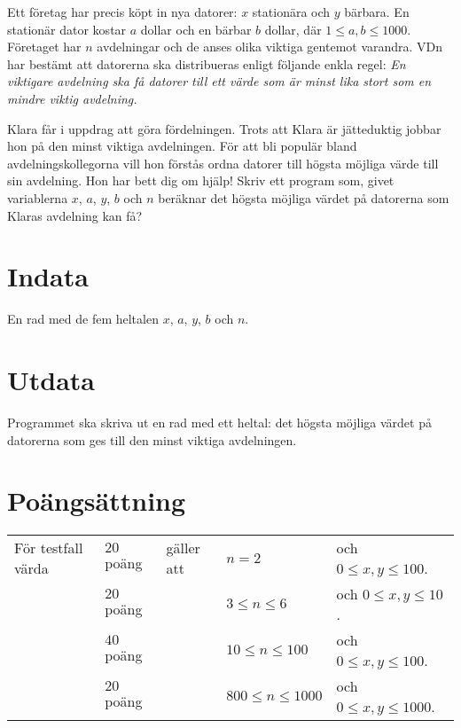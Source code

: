 
Ett företag har precis köpt in nya datorer: $x$ stationära och $y$
bärbara. En stationär dator kostar $a$ dollar och en bärbar $b$
dollar, där $1\le a,b \le 1000$. Företaget har $n$ avdelningar och de
anses olika viktiga gentemot varandra. VDn har bestämt att datorerna
ska distribueras enligt följande enkla regel: {\em En viktigare avdelning ska få datorer till ett värde som är minst lika stort som en mindre viktig avdelning.}

Klara får i uppdrag att göra fördelningen. Trots att Klara är jätteduktig jobbar hon på den minst viktiga avdelningen. För att bli populär bland avdelningskollegorna vill hon förstås ordna datorer till högsta möjliga värde till sin avdelning. Hon har bett dig om hjälp! Skriv ett program som, givet variablerna $x$, $a$, $y$, $b$ och $n$ beräknar det högsta möjliga värdet på datorerna som Klaras avdelning kan få?


\section*{Indata}
En rad med de fem heltalen $x$, $a$, $y$, $b$ och $n$.

\section*{Utdata}

Programmet ska skriva ut en rad med ett heltal: det högsta möjliga värdet på datorerna som ges till den minst viktiga avdelningen.

\section*{Poängsättning}

\begin{tabular}{lllll}
För testfall värda &$20$ poäng & gäller att &$n=2$ & och  $0\le x,y \le 100$. \\
&$20$ poäng &  & $3\le n\le 6$ & och $0\le x,y \le 10$. \\
&$40$ poäng &  & $10\le n\le 100$ & och $0\le x,y \le 100$. \\
&$20$ poäng &  & $800\le n\le 1000$ & och $0\le x,y \le 1000$. \\
\end{tabular}
